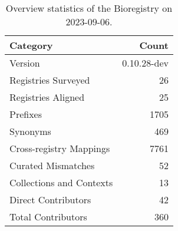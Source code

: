 \begin{table}
\caption{Overview statistics of the Bioregistry on 2023-09-06.}
\label{tab:bioregistry-summary}
\begin{tabular}{lr}
\toprule
Category & Count \\
\midrule
Version & 0.10.28-dev \\
Registries Surveyed & 26 \\
Registries Aligned & 25 \\
Prefixes & 1705 \\
Synonyms & 469 \\
Cross-registry Mappings & 7761 \\
Curated Mismatches & 52 \\
Collections and Contexts & 13 \\
Direct Contributors & 42 \\
Total Contributors & 360 \\
\bottomrule
\end{tabular}
\end{table}
